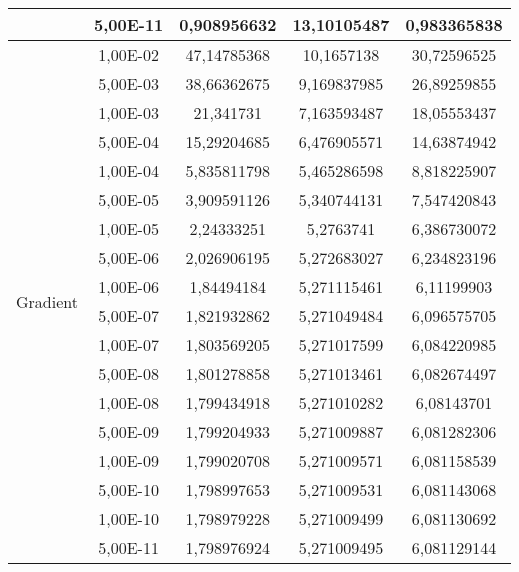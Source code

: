 \documentclass[12pt, a4paper]{report}
\begin{document}
\begin{center}
\begin{tabular}{|c|c|c|c|c|}
 & 5,00E-11 & 0,908956632 & 13,10105487 & 0,983365838 \\
\hline
\multirow{18}{*}{Gradient} & 1,00E-02 & 47,14785368 & 10,1657138 & 30,72596525 \\
 & 5,00E-03 & 38,66362675 & 9,169837985 & 26,89259855 \\
 & 1,00E-03 & 21,341731 & 7,163593487 & 18,05553437 \\
 & 5,00E-04 & 15,29204685 & 6,476905571 & 14,63874942 \\
 & 1,00E-04 & 5,835811798 & 5,465286598 & 8,818225907 \\
 & 5,00E-05 & 3,909591126 & 5,340744131 & 7,547420843 \\
 & 1,00E-05 & 2,24333251 & 5,2763741 & 6,386730072 \\
 & 5,00E-06 & 2,026906195 & 5,272683027 & 6,234823196 \\
 & 1,00E-06 & 1,84494184 & 5,271115461 & 6,11199903 \\
 & 5,00E-07 & 1,821932862 & 5,271049484 & 6,096575705 \\
 & 1,00E-07 & 1,803569205 & 5,271017599 & 6,084220985 \\
 & 5,00E-08 & 1,801278858 & 5,271013461 & 6,082674497 \\
 & 1,00E-08 & 1,799434918 & 5,271010282 & 6,08143701 \\
 & 5,00E-09 & 1,799204933 & 5,271009887 & 6,081282306 \\
 & 1,00E-09 & 1,799020708 & 5,271009571 & 6,081158539 \\
 & 5,00E-10 & 1,798997653 & 5,271009531 & 6,081143068 \\
 & 1,00E-10 & 1,798979228 & 5,271009499 & 6,081130692 \\
 & 5,00E-11 & 1,798976924 & 5,271009495 & 6,081129144 \\
\hline

\end{tabular}
\end{center}
\end{document}
